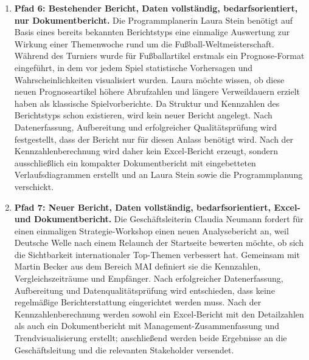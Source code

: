 \documentclass[11pt,a4paper]{article}
\newcommand{\companyname}{Deutsche Welle}
\begin{document}
\begin{enumerate}
  \item \textbf{Pfad 6: Bestehender Bericht, Daten vollständig, bedarfsorientiert, nur Dokumentbericht.} Die Programmplanerin Laura Stein ben\"otigt auf Basis eines bereits bekannten Berichtstyps eine einmalige Auswertung zur Wirkung einer Themenwoche rund um die Fu{\ss}ball-Weltmeisterschaft. W\"ahrend des Turniers wurde f\"ur Fu{\ss}ballartikel erstmals ein Prognose-Format eingef\"uhrt, in dem vor jedem Spiel statistische Vorhersagen und Wahrscheinlichkeiten visualisiert wurden. Laura m\"ochte wissen, ob diese neuen Prognoseartikel h\"ohere Abrufzahlen und l\"angere Verweildauern erzielt haben als klassische Spielvorberichte. Da Struktur und Kennzahlen des Berichtstyps schon existieren, wird kein neuer Bericht angelegt. Nach Datenerfassung, Aufbereitung und erfolgreicher Qualit\"atspr\"ufung wird festgestellt, dass der Bericht nur f\"ur diesen Anlass ben\"otigt wird. Nach der Kennzahlenberechnung wird daher kein Excel-Bericht erzeugt, sondern ausschlie{\ss}lich ein kompakter Dokumentbericht mit eingebetteten Verlaufsdiagrammen erstellt und an Laura Stein sowie die Programmplanung verschickt.

  \item \textbf{Pfad 7: Neuer Bericht, Daten vollständig, bedarfsorientiert, Excel- und Dokumentbericht.} Die Gesch\"aftsleiterin Claudia Neumann fordert f\"ur einen einmaligen Strategie-Workshop einen neuen Analysebericht an, weil \companyname{} nach einem Relaunch der Startseite bewerten m\"ochte, ob sich die Sichtbarkeit internationaler Top-Themen verbessert hat. Gemeinsam mit Martin Becker aus dem Bereich MAI definiert sie die Kennzahlen, Vergleichszeitr\"aume und Empf\"anger. Nach erfolgreicher Datenerfassung, Aufbereitung und Datenqualit\"atspr\"ufung wird entschieden, dass keine regelm\"a{\ss}ige Berichterstattung eingerichtet werden muss. Nach der Kennzahlenberechnung werden sowohl ein Excel-Bericht mit den Detailzahlen als auch ein Dokumentbericht mit Management-Zusammenfassung und Trendvisualisierung erstellt; anschlie{\ss}end werden beide Ergebnisse an die Gesch\"aftsleitung und die relevanten Stakeholder versendet.


\end{enumerate}
\end{document}
